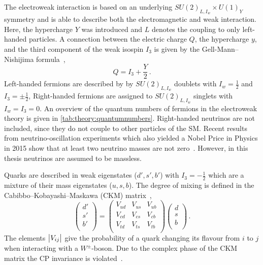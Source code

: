 The electroweak interaction is based on an underlying $SU{(2)}_{L,I_w} \times U{(1)}_Y$ symmetry
and is able to describe both the electromagnetic and weak interaction.
Here, the hypercharge $Y$ was introduced and $L$ denotes the coupling to only left-handed particles.
A connection between the electric charge $Q$, the hypercharge $y$, and the third component of the weak isospin $I_3$
is given by the Gell-Mann--Nishijima formula~\cite{Nishijima1955,GellMann1956},
\begin{equation}
    Q = I_3 + \frac{Y}{2} \,.
\end{equation}
Left-handed fermions are described by by $SU{(2)}_{L,I_w}$ doublets with $I_w = \frac{1}{2}$ and $I_3 = \pm \frac{1}{2}$,
Right-handed fermions are assigned to $SU{(2)}_{L,I_w}$ singlets with $I_w = I_3 = 0$.
An overview of the quantum numbers of fermions in the electroweak theory is given in \cref{tab:theory:quantumnumbers}.
Right-handed neutrinos are not included, since they do not couple to other particles of the SM\@.
Recent results from neutrino-oscillation experiments which also yielded a Nobel Price in Physics in 2015 show that at
least two neutrino masses are not zero~\cite{NeutrinoOsc1,NeutrinoOsc2,NeutrinoOsc3,NeutrinoOsc4,NeutrinoOsc5,NeutrinoOsc6}.
However, in this thesis neutrinos are assumed to be massless.

Quarks are described in weak eigenstates ($d',s',b'$) with $I_3 = -\frac{1}{2}$ which are a mixture of their mass eigenstates ($u, s, b$).
The degree of mixing is defined in the Cabibbo--Kobayashi--Maskawa (CKM) matrix~\cite{CKM:KM,CKM:C},
\begin{equation}
    \begin{pmatrix}
        d' \\ s' \\ b' \\
    \end{pmatrix}
    =
    \begin{pmatrix}
        V_{ud} & V_{us} & V_{ub} \\
        V_{cd} & V_{cs} & V_{cb} \\
        V_{td} & V_{ts} & V_{tb} \\
    \end{pmatrix}
    \begin{pmatrix}
        d \\ s \\ b \\
    \end{pmatrix} \,.
\end{equation}
The elements $\left|V_{ij}\right|$ give the probability of a quark changing its flavour from $i$ to $j$ when interacting with a $W^\pm$-boson.
Due to the complex phase of the CKM matrix the CP invariance is violated~\cite{PhysRevLett.13.138}.

